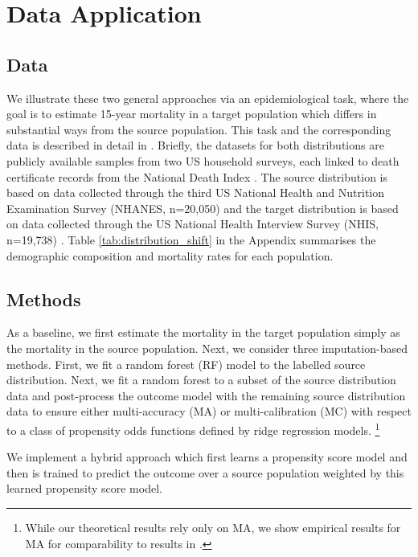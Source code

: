 \documentclass{article} %
\begin{document}
\section{Data Application}

\subsection{Data}
We illustrate these two general approaches via an epidemiological task, where the goal is to estimate 15-year mortality in a target population which differs in substantial ways from the source population. This task and the corresponding data is described in detail in \cite{kim2022universal}. Briefly, the datasets for both distributions are publicly available samples from two US household surveys, each linked to death certificate records from the National Death Index \citep{mort}. The source distribution is based on data collected through the third US National Health and Nutrition Examination Survey (NHANES, n=20,050) and the target distribution is based on data collected through the US National Health Interview Survey (NHIS, n=19,738) \citep{nhis,nhanes}. Table \ref{tab:distribution_shift} in the Appendix summarises the demographic composition and mortality rates for each population.  

\subsection{Methods}
As a baseline, we first estimate the mortality in the target population simply as the mortality in the source population. 
Next, we consider three imputation-based methods. First, we fit a random forest (RF) model to the labelled source distribution. Next, we fit a random forest to a subset of the source distribution data and post-process the outcome model with the remaining source distribution data to ensure either multi-accuracy (MA) or multi-calibration (MC) with respect to a class of propensity odds functions defined by ridge regression models. \footnote{While our theoretical results rely only on MA, we show empirical results for MA for comparability to results in \cite{kim2022universal}.}

We implement a hybrid approach which first learns a propensity score model and then is trained to predict the outcome over a source population weighted by this learned propensity score model.
\end{document}
